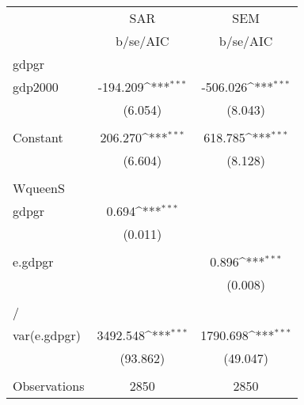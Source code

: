 {
\def\sym#1{\ifmmode^{#1}\else\(^{#1}\)\fi}
\begin{tabular}{l*{2}{c}}
\hline\hline
                    &         SAR         &         SEM         \\
                    &    b/se/AIC         &    b/se/AIC         \\
\hline
gdpgr               &                     &                     \\
gdp2000             &    -194.209\sym{***}&    -506.026\sym{***}\\
                    &     (6.054)         &     (8.043)         \\
                    &                     &                     \\
Constant            &     206.270\sym{***}&     618.785\sym{***}\\
                    &     (6.604)         &     (8.128)         \\
                    &                     &                     \\
\hline
WqueenS             &                     &                     \\
gdpgr               &       0.694\sym{***}&                     \\
                    &     (0.011)         &                     \\
                    &                     &                     \\
e.gdpgr             &                     &       0.896\sym{***}\\
                    &                     &     (0.008)         \\
                    &                     &                     \\
\hline
/                   &                     &                     \\
var(e.gdpgr)        &    3492.548\sym{***}&    1790.698\sym{***}\\
                    &    (93.862)         &    (49.047)         \\
                    &                     &                     \\
\hline
Observations        &        2850         &        2850         \\
\hline\hline
\end{tabular}
}
